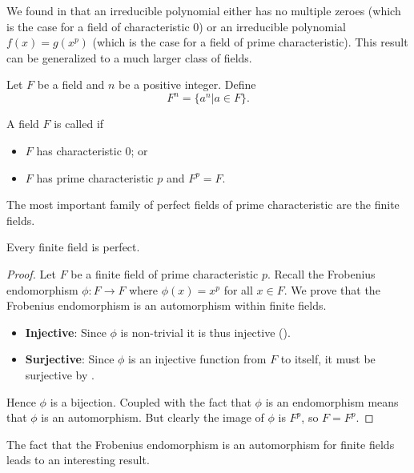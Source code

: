 We found in  that an irreducible polynomial either has no multiple zeroes (which is the case for a field of characteristic 0) or an irreducible polynomial $f(x) = g(x^p)$ (which is the case for a field of prime characteristic). This result can be generalized to a much larger class of fields.

\begin{definition}
    Let $F$ be a field and $n$ be a positive integer. Define
    \[
        F^n = \{a^n \vert a \in F\}.
    \]
\end{definition}

\begin{definition}
    A field $F$ is called  if
    \begin{itemize}
        \item $F$ has characteristic 0; or
        \item $F$ has prime characteristic $p$ and $F^p = F$.
    \end{itemize}
\end{definition}

The most important family of perfect fields of prime characteristic are the finite fields.

\begin{theorem}\label{thrm-finite-field-is-perfect}
    Every finite field is perfect.
\end{theorem}
\begin{proof}
    Let $F$ be a finite field of prime characteristic $p$. Recall the Frobenius endomorphism $\phi: F \to F$ where $\phi(x) = x^p$ for all $x \in F$. We prove that the Frobenius endomorphism is an automorphism within finite fields.
    \begin{itemize}
        \item \textbf{Injective}: Since $\phi$ is non-trivial it is thus injective ().
        \item \textbf{Surjective}: Since $\phi$ is an injective function from $F$ to itself, it must be surjective by .
    \end{itemize}
    Hence $\phi$ is a bijection. Coupled with the fact that $\phi$ is an endomorphism means that $\phi$ is an automorphism. But clearly the image of $\phi$ is $F^p$, so $F = F^p$.
\end{proof}

The fact that the Frobenius endomorphism is an automorphism for finite fields leads to an interesting result.

